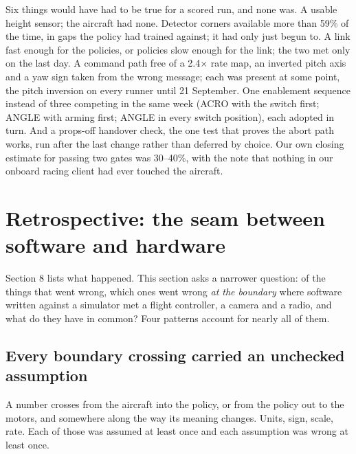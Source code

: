 \documentclass{article}
\begin{document}
Six things would have had to be true for a scored run, and none was. A usable height sensor; the aircraft had none. Detector corners available more than 59\% of the time, in gaps the policy had trained against; it had only just begun to. A link fast enough for the policies, or policies slow enough for the link; the two met only on the last day. A command path free of a 2.4$\times$ rate map, an inverted pitch axis and a yaw sign taken from the wrong message; each was present at some point, the pitch inversion on every runner until 21 September. One enablement sequence instead of three competing in the same week (ACRO with the switch first; ANGLE with arming first; ANGLE in every switch position), each adopted in turn. And a props-off handover check, the one test that proves the abort path works, run after the last change rather than deferred by choice. Our own closing estimate for passing two gates was 30--40\%, with the note that nothing in our onboard racing client had ever touched the aircraft.

\section{Retrospective: the seam between software and hardware}
Section 8 lists what happened. This section asks a narrower question: of the things that went wrong, which ones went wrong \emph{at the boundary} where software written against a simulator met a flight controller, a camera and a radio, and what do they have in common? Four patterns account for nearly all of them.

\subsection{Every boundary crossing carried an unchecked assumption}
A number crosses from the aircraft into the policy, or from the policy out to the motors, and somewhere along the way its meaning changes. Units, sign, scale, rate. Each of those was assumed at least once and each assumption was wrong at least once.
\end{document}
